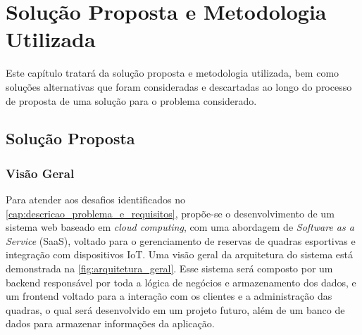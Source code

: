 \chapter{Solução Proposta e Metodologia Utilizada}\label{cap:solucao_proposta}

Este capítulo tratará da solução proposta e metodologia utilizada, bem como soluções alternativas que foram consideradas e descartadas ao longo do processo de proposta de uma solução para o problema considerado.






\section{Solução Proposta}

\subsection{Visão Geral}
Para atender aos desafios identificados no \autoref{cap:descricao_problema_e_requisitos}, propõe-se o desenvolvimento de um sistema web baseado em \textit{cloud computing}, com uma abordagem de \textit{Software as a Service} (SaaS), voltado para o gerenciamento de reservas de quadras esportivas e integração com dispositivos IoT. Uma visão geral da arquitetura do sistema está demonstrada na \autoref{fig:arquitetura_geral}. Esse sistema será composto por um backend responsável por toda a lógica de negócios e armazenamento dos dados, e um frontend voltado para a interação com os clientes e a administração das quadras, o qual será desenvolvido em um projeto futuro, além de um banco de dados para armazenar informações da aplicação.

